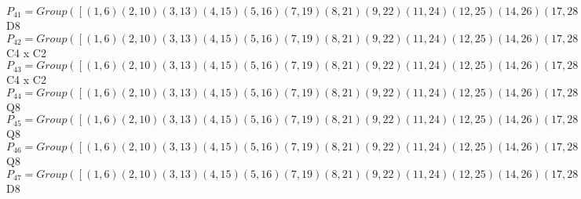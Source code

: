\documentclass[varwidth=\maxdimen,border=10]{standalone}
\begin{document}
\begin{tabular}
$P_{41} = Group( [ ( 1, 6)( 2,10)( 3,13)( 4,15)( 5,16)( 7,19)( 8,21)( 9,22)(11,24)(12,25)(14,26)(17,28)(18,29)(20,30)(23,31)(27,32), ( 1,24, 6,11)( 2,28,10,17)( 3, 4,13,15)( 5,31,16,23)( 7, 8,19,21)( 9,32,22,27)(12,14,25,26)(18,20,29,30), ( 1, 2)( 3,19)( 4, 8)( 5,22)( 6,10)( 7,13)( 9,16)(11,28)(12,18)(14,30)(15,21)(17,24)(20,26)(23,27)(25,29)(31,32) ] )\cong$ D8\ \\
$P_{42} = Group( [ ( 1, 6)( 2,10)( 3,13)( 4,15)( 5,16)( 7,19)( 8,21)( 9,22)(11,24)(12,25)(14,26)(17,28)(18,29)(20,30)(23,31)(27,32), ( 1, 5)( 2, 9)( 3,12)( 4,14)( 6,16)( 7,18)( 8,20)(10,22)(11,23)(13,25)(15,26)(17,27)(19,29)(21,30)(24,31)(28,32), ( 1, 3, 6,13)( 2, 7,10,19)( 4,24,15,11)( 5,12,16,25)( 8,28,21,17)( 9,18,22,29)(14,31,26,23)(20,32,30,27) ] )\cong$ C4 x C2\ \\
$P_{43} = Group( [ ( 1, 6)( 2,10)( 3,13)( 4,15)( 5,16)( 7,19)( 8,21)( 9,22)(11,24)(12,25)(14,26)(17,28)(18,29)(20,30)(23,31)(27,32), ( 1, 5)( 2, 9)( 3,12)( 4,14)( 6,16)( 7,18)( 8,20)(10,22)(11,23)(13,25)(15,26)(17,27)(19,29)(21,30)(24,31)(28,32), ( 1, 4, 6,15)( 2, 8,10,21)( 3,11,13,24)( 5,14,16,26)( 7,17,19,28)( 9,20,22,30)(12,23,25,31)(18,27,29,32) ] )\cong$ C4 x C2\ \\
$P_{44} = Group( [ ( 1, 6)( 2,10)( 3,13)( 4,15)( 5,16)( 7,19)( 8,21)( 9,22)(11,24)(12,25)(14,26)(17,28)(18,29)(20,30)(23,31)(27,32), ( 1,18, 6,29)( 2,12,10,25)( 3, 9,13,22)( 4,32,15,27)( 5,19,16, 7)( 8,31,21,23)(11,30,24,20)(14,17,26,28), ( 1, 4, 6,15)( 2, 8,10,21)( 3,11,13,24)( 5,14,16,26)( 7,17,19,28)( 9,20,22,30)(12,23,25,31)(18,27,29,32) ] )\cong$ Q8\ \\
$P_{45} = Group( [ ( 1, 6)( 2,10)( 3,13)( 4,15)( 5,16)( 7,19)( 8,21)( 9,22)(11,24)(12,25)(14,26)(17,28)(18,29)(20,30)(23,31)(27,32), ( 1,12, 6,25)( 2,18,10,29)( 3,16,13, 5)( 4,31,15,23)( 7,22,19, 9)( 8,32,21,27)(11,14,24,26)(17,20,28,30), ( 1, 8, 6,21)( 2, 4,10,15)( 3,28,13,17)( 5,30,16,20)( 7,24,19,11)( 9,26,22,14)(12,27,25,32)(18,23,29,31) ] )\cong$ Q8\ \\
$P_{46} = Group( [ ( 1, 6)( 2,10)( 3,13)( 4,15)( 5,16)( 7,19)( 8,21)( 9,22)(11,24)(12,25)(14,26)(17,28)(18,29)(20,30)(23,31)(27,32), ( 1,18, 6,29)( 2,12,10,25)( 3, 9,13,22)( 4,32,15,27)( 5,19,16, 7)( 8,31,21,23)(11,30,24,20)(14,17,26,28), ( 1, 8, 6,21)( 2, 4,10,15)( 3,28,13,17)( 5,30,16,20)( 7,24,19,11)( 9,26,22,14)(12,27,25,32)(18,23,29,31) ] )\cong$ Q8\ \\
$P_{47} = Group( [ ( 1, 6)( 2,10)( 3,13)( 4,15)( 5,16)( 7,19)( 8,21)( 9,22)(11,24)(12,25)(14,26)(17,28)(18,29)(20,30)(23,31)(27,32), ( 1,30)( 2,26)( 3,27)( 4, 9)( 5, 8)( 6,20)( 7,23)(10,14)(11,29)(12,28)(13,32)(15,22)(16,21)(17,25)(18,24)(19,31), ( 1,19)( 2,13)( 3,10)( 4,17)( 5,18)( 6, 7)( 8,11)( 9,12)(14,32)(15,28)(16,29)(20,31)(21,24)(22,25)(23,30)(26,27) ] )\cong$ D8\ \\

\end{tabular}
\end{document}
